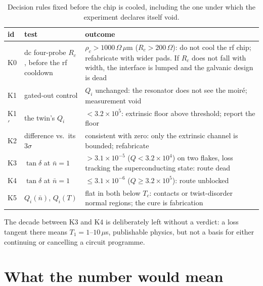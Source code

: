 \documentclass[aps,prb,reprint,superscriptaddress,longbibliography]{revtex4-2}
\begin{document}
\begin{table}[!tbp]
\caption{\label{tab:rules}Decision rules fixed before the chip is cooled,
including the one under which the experiment declares itself void.}
\begin{ruledtabular}
\begin{tabular}{lp{}p{}}
id & \raggedright test & \raggedright outcome \tabularnewline
\hline
K0 & \raggedright dc four-probe $R_c$, before the rf cooldown & \raggedright $\rho_c > 1000\,\Omega\,\mu$m ($R_c > 200\,\Omega$): do not cool the rf chip; refabricate with wider pads. If $R_c$ does not fall with width, the interface is lumped and the galvanic design is dead \tabularnewline
K1 & \raggedright gated-out control & \raggedright $Q_i$ unchanged: the resonator does not see the moir\'e; measurement void \tabularnewline
K1$'$ & \raggedright the twin's $Q_i$ & \raggedright $< 3.2 \times 10^{5}$: extrinsic floor above threshold; report the floor \tabularnewline
K2 & \raggedright difference vs.\ its $3\sigma$ & \raggedright consistent with zero: only the extrinsic channel is bounded; refabricate \tabularnewline
K3 & \raggedright $\tan\delta$ at $\bar n = 1$ & \raggedright $> 3.1 \times 10^{-5}$ ($Q < 3.2 \times 10^{4}$) on two flakes, loss tracking the superconducting state: route dead \tabularnewline
K4 & \raggedright $\tan\delta$ at $\bar n = 1$ & \raggedright $\leq 3.1 \times 10^{-6}$ ($Q \geq 3.2 \times 10^{5}$): route unblocked \tabularnewline
K5 & \raggedright $Q_i(\bar n)$, $Q_i(T)$ & \raggedright flat in both below $T_c$: contacts or twist-disorder normal regions; the cure is fabrication \tabularnewline
\end{tabular}
\end{ruledtabular}
\end{table}

The decade between K3 and K4 is deliberately left without a verdict: a
loss tangent there means $T_1 = 1$--$10\,\mu$s, publishable physics, but
not a basis for either continuing or cancelling a circuit programme.

\section{What the number would mean}
\label{sec:meaning}
\end{document}

